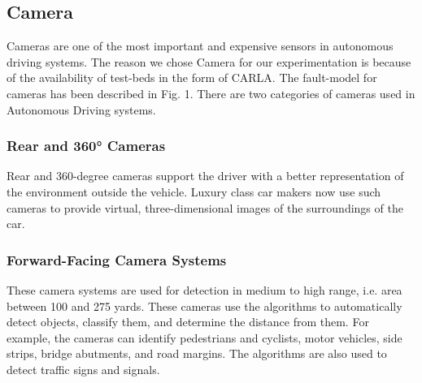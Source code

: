 %

\subsection{Camera}
Cameras are one of the most important and expensive sensors in autonomous driving systems. The reason we chose Camera for our experimentation is because of the availability of test-beds in the form of CARLA. The fault-model for cameras has been described in Fig. 1. There are two categories of cameras used in Autonomous Driving systems.

\smallskip
\subsubsection{Rear and 360° Cameras} 
Rear and 360-degree cameras support the driver with a better representation of the environment outside the vehicle. Luxury class car makers now use such cameras to provide virtual, three-dimensional images of the surroundings of the car.

\smallskip
\subsubsection{Forward-Facing Camera Systems}
These camera systems are used for detection in medium to high range, i.e. area between 100 and 275 yards. These cameras use the algorithms to automatically detect objects, classify them, and determine the distance from them. For example, the cameras can identify pedestrians and cyclists, motor vehicles, side strips, bridge abutments, and road margins. The algorithms are also used to detect traffic signs and signals.


